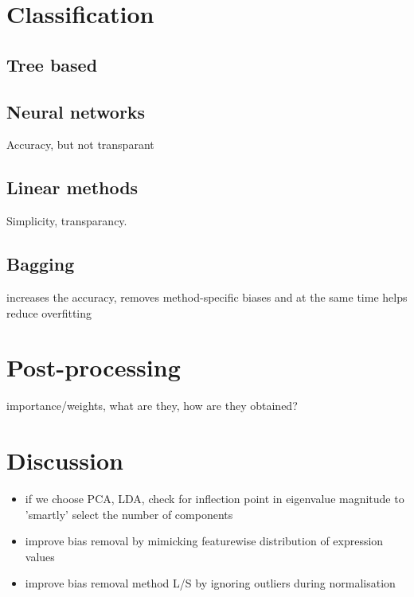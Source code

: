 \documentclass[a4paper,10pt]{article}
\begin{document}
\section{Classification}

\subsection{Tree based}


\subsection{Neural networks}

Accuracy, but not transparant

\subsection{Linear methods}

Simplicity, transparancy.

\subsection{Bagging}

increases the accuracy, removes method-specific biases and at the same time helps reduce overfitting

\section{Post-processing}

importance/weights, what are they, how are they obtained?

\section{Discussion}

\begin{itemize}
\item if we choose PCA, LDA, check for inflection point in eigenvalue magnitude to 'smartly' select the number of components
\item improve bias removal by mimicking featurewise distribution of expression values
\item improve bias removal method L/S by ignoring outliers during normalisation
\end{itemize}



\end{document}
